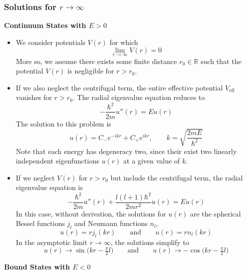 \documentclass[11pt, a4paper]{article}
\newcommand{\eqtext}[1]{\qquad \text{#1} \qquad}
\begin{document}
\subsubsection{Solutions for $ r \to \infty $}

\textbf{Continuum States with $ E > 0 $}
\begin{itemize}
	\item We consider potentials $ V(r) $ for which 
	\begin{equation*}
		\lim_{r \to \infty} V(r) = 0
	\end{equation*}
	More so, we assume there exists some finite distance $ r_{0} \in \mathbb{R} $ such that the potential $ V(r) $ is negligible for $ r > r_{0} $. 
	
	\item If we also neglect the centrifugal term, the entire effective potential $ V_{\text{eff}} $ vanishes for $ r > r_{0} $. The radial eigenvalue equation reduces to
	\begin{equation*}
		- \frac{\hbar^{2}}{2m}u''(r) = Eu(r)
	\end{equation*}
	The solution to this problem is
	\begin{equation*}
		u(r) = C_{-}e^{-i k r} + C_{+}e^{i k r}, \qquad k = \sqrt{\frac{2mE}{\hbar^{2}}}
	\end{equation*}
	Note that each energy has degeneracy two, since their exist two linearly independent eigenfunctions $ u(r) $ at a given value of $ k $. 
	
	\item If we neglect $ V(r) $ for $ r > r_{0} $ but include the centrifugal term, the radial eigenvalue equation is
	\begin{equation*}
		-\frac{\hbar^{2}}{2m}u''(r) + \frac{l (l+1)\hbar^{2}}{2mr^{2}}u(r) = E u(r)
	\end{equation*}
	In this case, without derivation, the solutions for $ u(r) $ are the spherical Bessel functions $ j_{l} $ and Neumann functions $ n_{l} $,
	\begin{equation*}
		u(r) = rj_{l}(kr) \eqtext{and} u(r) = r n_{l}(kr)
	\end{equation*}
	In the asymptotic limit $ r \to \infty $, the solutions simplify to
	\begin{equation*}
		u(r) \to \sin\big(kr - \tfrac{\pi}{2}l\big) \eqtext{and} u(r) \to - \cos\big(kr - \tfrac{\pi}{2}l\big)
	\end{equation*}
\end{itemize}
\textbf{Bound States with $ E < 0 $}
\end{document}
